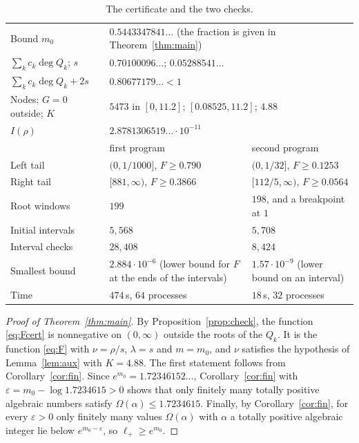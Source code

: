 \documentclass[11pt]{amsart}
\theoremstyle{remark}
\numberwithin{equation}{section}
\newcommand{\MzeroDec}{0.5443347841}
\newcommand{\EMzero}{1.7234615}
\newcommand{\EMzeroLong}{1.72346152}
\newcommand{\NNodes}{5473}
\newcommand{\Sval}{0.05288541}
\newcommand{\DegSum}{0.70100096}
\newcommand{\Budget}{0.80677179}
\newcommand{\Kconst}{4.88}
\newcommand{\Ival}{2.8781306519\ldots\cdot10^{-11}}
\newcommand{\SuppLo}{0.08525}
\newcommand{\SuppHi}{11.2}
\newcommand{\XLO}{1/1000}
\newcommand{\XHI}{881}
\newcommand{\LTail}{0.790}
\newcommand{\RTail}{0.3866}
\newcommand{\NWinA}{199}
\newcommand{\NInitA}{5{,}568}
\newcommand{\NChkA}{28{,}408}
\newcommand{\MinEndA}{2.884\cdot10^{-6}}
\newcommand{\TimeA}{474}
\newcommand{\ProcA}{64}
\newcommand{\XLOB}{1/32}
\newcommand{\XHIB}{112/5}
\newcommand{\LTailB}{0.1253}
\newcommand{\RTailB}{0.0564}
\newcommand{\NWinB}{198}
\newcommand{\NInitB}{5{,}708}
\newcommand{\NChkB}{8{,}424}
\newcommand{\MinCertB}{1.57\cdot10^{-9}}
\newcommand{\TimeB}{18}
\newcommand{\ProcB}{32}
\begin{document}
\begin{table}[ht]
\centering
\caption{The certificate and the two checks.}\label{tab:checks}
\small
\begin{tabular}{@{}p{}p{}p{}@{}}
\toprule
Bound $m_0$ & \multicolumn{2}{l}{$\MzeroDec\ldots$ (the fraction is given in Theorem~\ref{thm:main})}\\
$\sum_kc_k\deg Q_k$; $s$ & \multicolumn{2}{l}{$\DegSum\ldots$; $\Sval\ldots$}\\
$\sum_kc_k\deg Q_k+2s$ & \multicolumn{2}{l}{$\Budget\ldots<1$}\\
Nodes; $G=0$ outside; $K$ & \multicolumn{2}{l}{$\NNodes$ in $[0,\SuppHi]$; $[\SuppLo,\SuppHi]$; $\Kconst$}\\
$I(\rho)$ & \multicolumn{2}{l}{$\Ival$}\\
\midrule
 & first program & second program\\
\midrule
Left tail & $(0,\XLO]$, $F\ge\LTail$ & $(0,\XLOB]$, $F\ge\LTailB$\\
Right tail & $[\XHI,\infty)$, $F\ge\RTail$ & $[\XHIB,\infty)$, $F\ge\RTailB$\\
Root windows & $\NWinA$ & $\NWinB$, and a breakpoint at $1$\\
Initial intervals & $\NInitA$ & $\NInitB$\\
Interval checks & $\NChkA$ & $\NChkB$\\
Smallest bound & $\MinEndA$ (lower bound for $F$ at the ends of the intervals) & $\MinCertB$ (lower bound on an interval)\\
Time & $\TimeA$\,s, $\ProcA$ processes & $\TimeB$\,s, $\ProcB$ processes\\
\bottomrule
\end{tabular}
\end{table}

\begin{proof}[Proof of Theorem~\ref{thm:main}]
By Proposition~\ref{prop:check}, the function \eqref{eq:Fcert} is nonnegative on $(0,\infty)$ outside the roots of the $Q_k$. It is the function \eqref{eq:F} with $\nu=\rho/s$, $\lambda=s$ and $m=m_0$, and $\nu$ satisfies the hypothesis of Lemma~\ref{lem:aux} with $K=\Kconst$. The first statement follows from Corollary~\ref{cor:fin}. Since $e^{m_0}=\EMzeroLong\ldots$, Corollary~\ref{cor:fin} with $\varepsilon=m_0-\log\EMzero>0$ shows that only finitely many totally positive algebraic numbers satisfy $\Omega(\alpha)\le\EMzero$. Finally, by Corollary~\ref{cor:fin}, for every $\varepsilon>0$ only finitely many values $\Omega(\alpha)$ with $\alpha$ a totally positive algebraic integer lie below $e^{m_0-\varepsilon}$, so $\ell_+\ge e^{m_0}$.
\end{proof}
\end{document}
